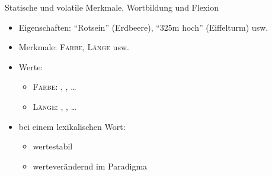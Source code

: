 \begin{frame}
  {Statische und volatile Merkmale, Wortbildung und Flexion}
  \pause
  \begin{itemize}[<+->]
    \item Eigenschaften: "`Rotsein"' (Erdbeere), "`325m hoch"' (Eiffelturm) usw.
    \item Merkmale: \alert{\textsc{Farbe}}, \alert{\textsc{Länge}} usw.
    \item Werte:
      \begin{itemize}[<+->]
        \item \alert{\textsc{Farbe}}: , , \ldots
        \item \alert{\textsc{Länge}}: \rot{\textit{3cm}}, , \ldots
      \end{itemize}
  \end{itemize}
  \pause
  \Zeile
  \begin{exe}
    \ex
    \begin{xlist}
      \pause
      \pause
    \end{xlist}
  \end{exe}
  \Zeile
  \pause
  \begin{itemize}[<+->]
    \item bei einem lexikalischen Wort:
      \begin{itemize}
        \item {} wertestabil
        \item {} werteverändernd im Paradigma
      \end{itemize}
  \end{itemize}
\end{frame}

